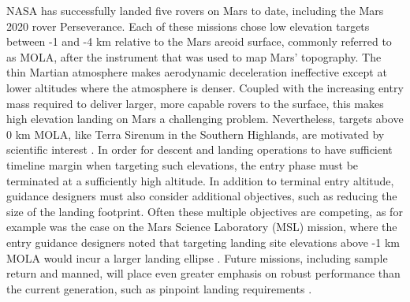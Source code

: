 NASA has successfully landed five rovers on Mars to date, including the Mars 2020 rover Perseverance. Each of these missions chose low elevation targets between -1 and -4 km relative to the Mars areoid surface, commonly referred to as MOLA, after the instrument that was used to map Mars' topography. The thin Martian atmosphere makes aerodynamic deceleration ineffective except at lower altitudes where the atmosphere is denser. Coupled with the increasing entry mass required to deliver larger, more capable rovers to the surface, this makes high elevation landing on Mars a challenging problem. Nevertheless, targets above 0 km MOLA, like Terra Sirenum in the Southern Highlands, are motivated by scientific interest \cite{MarsWater}. In order for descent and landing operations to have sufficient timeline margin \cite{BraunMarsEDL,MSL_EDL2} when targeting such elevations, the entry phase must be terminated at a sufficiently high altitude.
In addition to terminal entry altitude, guidance designers must also consider additional objectives, such as reducing the size of the landing footprint. Often these multiple objectives are competing, as for example was the case on the Mars Science Laboratory (MSL) mission, where the entry guidance designers noted that targeting landing site elevations above -1 km MOLA would incur a larger landing ellipse \cite{MSL_EDL2}. 
Future missions, including sample return \cite{MSR} and manned, will place even greater emphasis on robust performance than the current generation, such as pinpoint landing requirements \cite{EvolvableMars}. 

